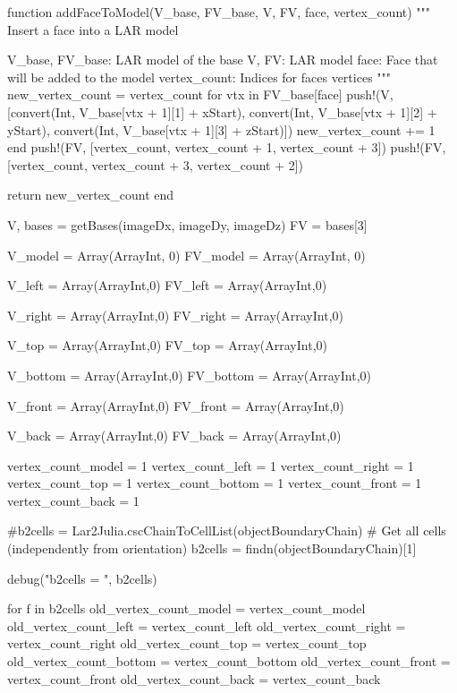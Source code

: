 \documentclass[11pt,oneside]{article}	%
\begin{document}
{  function addFaceToModel(V_base, FV_base, V, FV, face, vertex_count)
    """
    Insert a face into a LAR model

    V_base, FV_base: LAR model of the base
    V, FV: LAR model
    face: Face that will be added to the model
    vertex_count: Indices for faces vertices
    """
    new_vertex_count = vertex_count
    for vtx in FV_base[face]
      push!(V, [convert(Int, V_base[vtx + 1][1] + xStart),
                      convert(Int, V_base[vtx + 1][2] + yStart),
                      convert(Int, V_base[vtx + 1][3] + zStart)])
      new_vertex_count += 1
    end
    push!(FV, [vertex_count, vertex_count + 1, vertex_count + 3])
    push!(FV, [vertex_count, vertex_count + 3, vertex_count + 2])

    return new_vertex_count
  end

  V, bases = getBases(imageDx, imageDy, imageDz)
  FV = bases[3]

  V_model = Array(Array{Int}, 0)
  FV_model = Array(Array{Int}, 0)

  V_left = Array(Array{Int},0)
  FV_left = Array(Array{Int},0)

  V_right = Array(Array{Int},0)
  FV_right = Array(Array{Int},0)

  V_top = Array(Array{Int},0)
  FV_top = Array(Array{Int},0)

  V_bottom = Array(Array{Int},0)
  FV_bottom = Array(Array{Int},0)

  V_front = Array(Array{Int},0)
  FV_front = Array(Array{Int},0)

  V_back = Array(Array{Int},0)
  FV_back = Array(Array{Int},0)

  vertex_count_model = 1
  vertex_count_left = 1
  vertex_count_right = 1
  vertex_count_top = 1
  vertex_count_bottom = 1
  vertex_count_front = 1
  vertex_count_back = 1

  #b2cells = Lar2Julia.cscChainToCellList(objectBoundaryChain)
  # Get all cells (independently from orientation)
  b2cells = findn(objectBoundaryChain)[1]

  debug("b2cells = ", b2cells)

  for f in b2cells
    old_vertex_count_model = vertex_count_model
    old_vertex_count_left = vertex_count_left
    old_vertex_count_right = vertex_count_right
    old_vertex_count_top = vertex_count_top
    old_vertex_count_bottom = vertex_count_bottom
    old_vertex_count_front = vertex_count_front
    old_vertex_count_back = vertex_count_back

}
\end{document}

